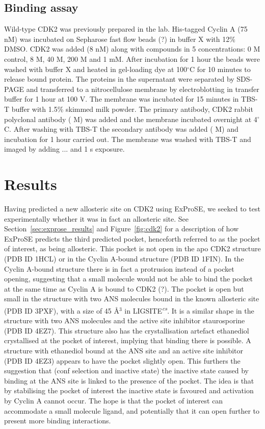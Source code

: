 \subsection{Binding assay}

Wild-type CDK2 was previously prepared in the lab.
His-tagged Cyclin A (75 nM) was incubated on Sepharose fast flow beads (?) in buffer X with 12\% DMSO.
CDK2 was added (8 nM) along with compounds in 5 concentrations: 0 M control, 8 \textmu M, 40 \textmu M, 200 \textmu M and 1 mM.
After incubation for 1 hour the beads were washed with buffer X and heated in gel-loading dye at 100$^{\circ}$C for 10 minutes to release bound protein.
The proteins in the supernatant were separated by SDS-PAGE and transferred to a nitrocellulose membrane by electroblotting in transfer buffer for 1 hour at 100 V.
The membrane was incubated for 15 minutes in TBS-T buffer with 1.5\% skimmed milk powder.
The primary antibody, CDK2 rabbit polyclonal antibody ( M) was added and the membrane incubated overnight at 4$^{\circ}$C.
After washing with TBS-T the secondary antibody was added ( M) and incubation for 1 hour carried out.
The membrane was washed with TBS-T and imaged by adding ... and 1 s exposure.


\section{Results}
\label{sec:cdk2_results}

Having predicted a new allosteric site on CDK2 using ExProSE, we seeked to test experimentally whether it was in fact an allosteric site.
See Section~\ref{sec:exprose_results} and Figure~\ref{fig:cdk2} for a description of how ExProSE predicts the third predicted pocket, henceforth referred to as the pocket of interest, as being allosteric.
This pocket is not open in the apo CDK2 structure (PDB ID 1HCL) or in the Cyclin A-bound structure (PDB ID 1FIN).
In the Cyclin A-bound structure there is in fact a protrusion instead of a pocket opening, suggesting that a small molecule would not be able to bind the pocket at the same time as Cyclin A is bound to CDK2 (?).
The pocket is open but small in the structure with two ANS molecules bound in the known allosteric site (PDB ID 3PXF), with a size of 45 \AA$^{3}$ in LIGSITE\textsuperscript{\it cs}.
It is a similar shape in the structure with two ANS molecules and the active site inhibitor staurosporine (PDB ID 4EZ7).
This structure also has the crystallisation artefact ethanediol crystallised at the pocket of interest, implying that binding there is possible.
A structure with ethanediol bound at the ANS site and an active site inhibitor (PDB ID 4EZ3) appears to have the pocket slightly open.
This furthers the suggestion that (conf selection and inactive state) the inactive state caused by binding at the ANS site is linked to the presence of the pocket.
The idea is that by stabilising the pocket of interest the inactive state is favoured and activation by Cyclin A cannot occur.
The hope is that the pocket of interest can accommodate a small molecule ligand, and potentially that it can open further to present more binding interactions.

